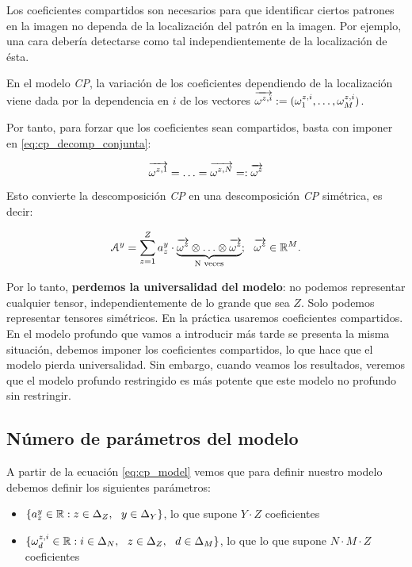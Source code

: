 Los coeficientes compartidos son necesarios para que identificar ciertos patrones en la imagen no dependa de la localización del patrón en la imagen. Por ejemplo, una cara debería detectarse como tal independientemente de la localización de ésta.

En el modelo \textit{CP}, la variación de los coeficientes dependiendo de la localización viene dada por la dependencia en $i$ de los vectores $\overrightarrow{\omega^{z,i}} := (\omega^{z, i}_1, \ldots, \omega^{z, i}_M)$.

Por tanto, para forzar que los coeficientes sean compartidos, basta con imponer en \eqref{eq:cp_decomp_conjunta}:

\begin{equation}
	\overrightarrow{\omega^{z, 1}} = \ldots = \overrightarrow{\omega^{z, N}} =: \overrightarrow{\omega^z}
\end{equation}

Esto convierte la descomposición \textit{CP} en una descomposición \textit{CP} simétrica, es decir:

\begin{equation}
	\mathcal{A}^y = \sum_{z = 1}^Z a_z^y \cdot \underbrace{\overrightarrow{\omega^z} \otimes \ldots \otimes \overrightarrow{\omega^z}}_\textrm{N veces}; \ \  \overrightarrow{\omega^z} \in \mathbb{R}^M.
\end{equation}

Por lo tanto, \textbf{perdemos la universalidad del modelo}: no podemos representar cualquier tensor, independientemente de lo grande que sea $Z$. Solo podemos representar tensores simétricos. En la práctica usaremos coeficientes compartidos. En el modelo profundo que vamos a introducir más tarde se presenta la misma situación, debemos imponer los coeficientes compartidos, lo que hace que el modelo pierda universalidad. Sin embargo, cuando veamos los resultados, veremos que el modelo profundo restringido es más potente que este modelo no profundo sin restringir.

\subsection{Número de parámetros del modelo} \label{msubsec:parametros_modelo_cp}

A partir de la ecuación \eqref{eq:cp_model} vemos que para definir nuestro modelo debemos definir los siguientes parámetros:

\begin{itemize}
	\item $\{a_z^y \in \mathbb{R} : z \in \Delta_{Z}, \ \  y \in \Delta_{Y}\}$, lo que supone $Y \cdot Z$ coeficientes
	\item $\{\omega_d^{z, i} \in \mathbb{R}: i \in \Delta_{N}, \ \  z \in \Delta_{Z}, \ \  d \in \Delta_{M}\}$, lo que lo que supone $N \cdot M \cdot Z$ coeficientes
\end{itemize}

